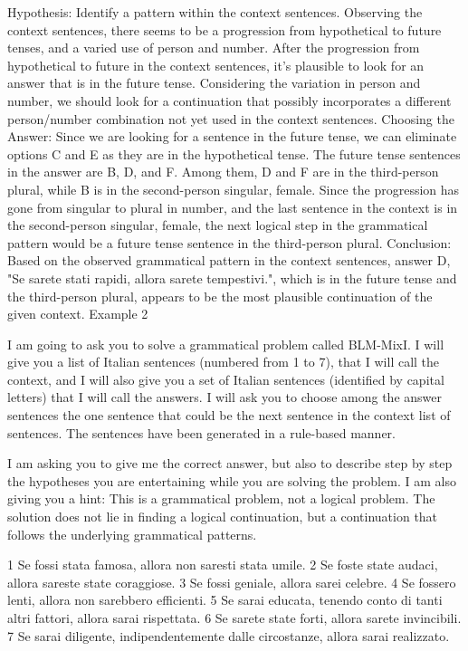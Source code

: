 Hypothesis:
Identify a pattern within the context sentences. Observing the context sentences, there seems to be a progression from hypothetical to future tenses, and a varied use of person and number.
After the progression from hypothetical to future in the context sentences, it’s plausible to look for an answer that is in the future tense.
Considering the variation in person and number, we should look for a continuation that possibly incorporates a different person/number combination not yet used in the context sentences.
Choosing the Answer:
Since we are looking for a sentence in the future tense, we can eliminate options C and E as they are in the hypothetical tense.
The future tense sentences in the answer are B, D, and F. Among them, D and F are in the third-person plural, while B is in the second-person singular, female.
Since the progression has gone from singular to plural in number, and the last sentence in the context is in the second-person singular, female, the next logical step in the grammatical pattern would be a future tense sentence in the third-person plural.
Conclusion:
Based on the observed grammatical pattern in the context sentences, answer D, "Se sarete stati rapidi, allora sarete tempestivi.", which is in the future tense and the third-person plural, appears to be the most plausible continuation of the given context.
Example 2

I am going to ask you to solve a grammatical problem called BLM-MixI.  I will give you a list of Italian sentences (numbered from 1 to 7), that I will call the context, and I will also give you a set of Italian sentences (identified by capital letters) that I will call  the answers. I will ask you to choose among the answer sentences the one sentence that could be the next sentence in the context list of sentences. The sentences have been generated in a rule-based manner. 

I am asking you to give me the correct answer, but also to describe step by step  the hypotheses you are entertaining while you are solving the problem.
I am also giving you a hint: This is a grammatical problem, not a logical problem. The solution does not lie in finding a logical continuation, but a continuation that follows the underlying grammatical patterns.


1 Se fossi stata famosa, allora non saresti stata umile.
2 Se foste state audaci, allora sareste state coraggiose.
3 Se fossi geniale, allora sarei celebre.
4 Se fossero lenti, allora non sarebbero efficienti.
5 Se sarai educata, tenendo conto di tanti altri fattori, allora sarai rispettata.
6 Se sarete state forti, allora sarete invincibili.
7 Se sarai diligente, indipendentemente dalle circostanze, allora sarai realizzato.


